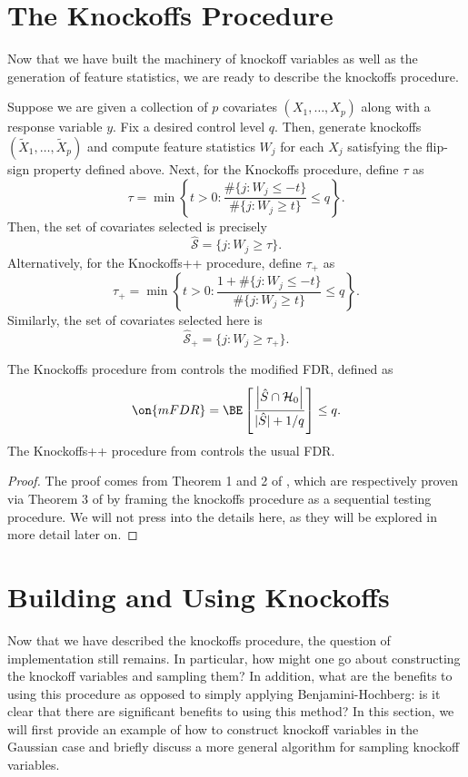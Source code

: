 \section{The Knockoffs Procedure}
Now that we have built the machinery of knockoff variables as well as the generation of feature statistics, we are ready to describe the knockoffs procedure.
\begin{proc}
\label{knockproc}
Suppose we are given a collection of $p$ covariates $(X_1, \ldots, X_p)$ along with a response variable $y$. Fix a desired control level $q$. Then, generate knockoffs $(\tilde{X}_1, \ldots, \tilde{X}_p)$ and compute feature statistics $W_j$ for each $X_j$ satisfying the flip-sign property defined above. Next, for the Knockoffs procedure, define $\tau$ as
\begin{equation}
\tau = \min \left\{ t > 0 : \frac{\# \{ j : W_j \leq -t \} }{\# \{ j : W_j \geq t \} } \leq q \right\}.
\end{equation}
Then, the set of covariates selected is precisely
\begin{equation}
\hat{\mathcal{S}} = \{ j : W_j \geq \tau \}.
\end{equation}
Alternatively, for the Knockoffs++ procedure, define $\tau_+$ as 
\begin{equation}
\tau_+ = \min \left\{ t > 0 : \frac{1 + \# \{ j : W_j \leq -t \} }{\# \{ j : W_j \geq t \} } \leq q \right\}.
\end{equation}
Similarly, the set of covariates selected here is 
\begin{equation}
\hat{\mathcal{S}}_+ = \{ j : W_j \geq \tau_+ \}.
\end{equation}
\end{proc}
\begin{theorem}
The Knockoffs procedure from  controls the modified FDR, defined as
\[ \on{mFDR} = \BE \left[ \frac{ \left| \hat{S} \cap \mathcal{H}_0 \right|}{|\hat{S}| + 1 / q} \right] \leq q. \] The Knockoffs++ procedure from  controls the usual FDR.
\end{theorem}
\begin{proof}
The proof comes from Theorem 1 and 2 of \cite{knockoffs}, which are respectively proven via Theorem 3 of \cite{knockoffs} by framing the knockoffs procedure as a sequential testing procedure. We will not press into the details here, as they will be explored in more detail later on.
\end{proof}

\section{Building and Using Knockoffs}
Now that we have described the knockoffs procedure, the question of implementation still remains. In particular, how might one go about constructing the knockoff variables and sampling them? In addition, what are the benefits to using this procedure as opposed to simply applying Benjamini-Hochberg: is it clear that there are significant benefits to using this method? In this section, we will first provide an example of how to construct knockoff variables in the Gaussian case and briefly discuss a more general algorithm for sampling knockoff variables.   
